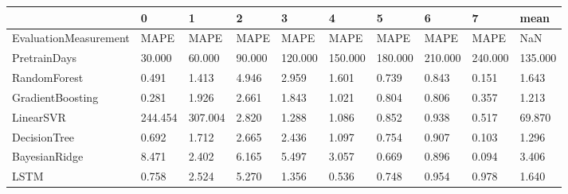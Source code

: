 \begin{tabular}{llllllllll}
\toprule
{} &       0 &       1 &      2 &       3 &       4 &       5 &       6 &       7 &    mean \\
\midrule
EvaluationMeasurement &    MAPE &    MAPE &   MAPE &    MAPE &    MAPE &    MAPE &    MAPE &    MAPE &     NaN \\
PretrainDays          &  30.000 &  60.000 & 90.000 & 120.000 & 150.000 & 180.000 & 210.000 & 240.000 & 135.000 \\
RandomForest          &   0.491 &   1.413 &  4.946 &   2.959 &   1.601 &   0.739 &   0.843 &   0.151 &   1.643 \\
GradientBoosting      &   0.281 &   1.926 &  2.661 &   1.843 &   1.021 &   0.804 &   0.806 &   0.357 &   1.213 \\
LinearSVR             & 244.454 & 307.004 &  2.820 &   1.288 &   1.086 &   0.852 &   0.938 &   0.517 &  69.870 \\
DecisionTree          &   0.692 &   1.712 &  2.665 &   2.436 &   1.097 &   0.754 &   0.907 &   0.103 &   1.296 \\
BayesianRidge         &   8.471 &   2.402 &  6.165 &   5.497 &   3.057 &   0.669 &   0.896 &   0.094 &   3.406 \\
LSTM                  &   0.758 &   2.524 &  5.270 &   1.356 &   0.536 &   0.748 &   0.954 &   0.978 &   1.640 \\
\bottomrule
\end{tabular}
